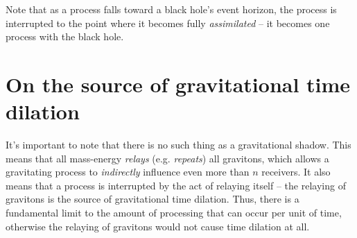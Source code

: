 \documentclass[12pt]{article}
\begin{document}
{%


Note that as a process falls toward a black hole's event horizon, the process is interrupted to the point where it becomes fully {\textit{assimilated}} -- it becomes one process with the black hole.






\section{On the source of gravitational time dilation}
It's important to note that there is no such thing as a gravitational shadow.
This means that all mass-energy {\textit{relays}} (e.g. {\textit{repeats}}) all gravitons, which allows a gravitating process to {\textit{indirectly}} influence even more than $n$ receivers.
It also means that a process is interrupted by the act of relaying itself -- the relaying of gravitons is the source of gravitational time dilation.
Thus, there is a fundamental limit to the amount of processing that can occur per unit of time, otherwise the relaying of gravitons would not cause time dilation at all.

}
\end{document}
